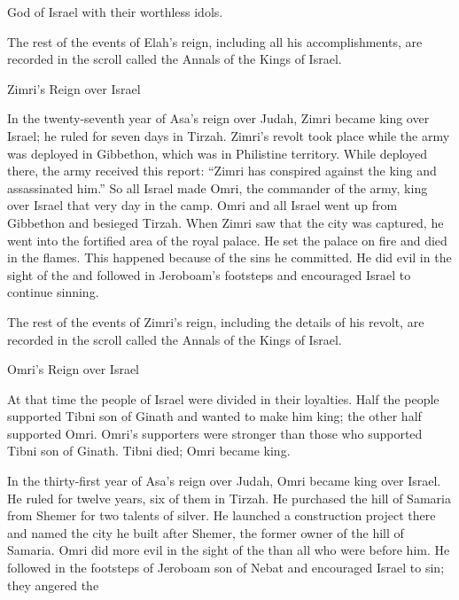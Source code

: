 {{}
God
of Israel
with their worthless idols.
\par }{\PP {}The rest
of the events
of Elah’s
reign, including all
his accomplishments,
are recorded
in the scroll
called the Annals
of the Kings
of Israel.
\par }{\SH Zimri’s Reign over Israel
\par }{\PP {}In the twenty-seventh
year
of Asa’s
reign over
Judah,
Zimri
became king over Israel; he ruled
for seven
days
in Tirzah.
Zimri’s revolt took place while the army
was deployed
in
Gibbethon,
which
was in Philistine territory.
While deployed
there, the army
received
this report: “Zimri
has conspired
against the king
and assassinated
him.” So all
Israel
made Omri,
the commander
of the army,
king over
Israel
that
very day
in the camp.
Omri
and all
Israel
went up
from Gibbethon
and besieged
Tirzah.
When
Zimri
saw
that
the city
was captured,
he went
into the fortified area
of the royal
palace.
He set
the palace
on
fire
and died in the flames.
This happened
because of the sins
he committed.
He did
evil
in the sight
of the
{}
and followed
in Jeroboam’s
footsteps
and encouraged
Israel
to continue sinning.
\par }{\PP {}The rest
of the events
of Zimri’s
reign, including
the details of his revolt,
are recorded
in
the scroll
called the Annals
of the Kings
of Israel.
\par }{\SH Omri’s Reign over Israel
\par }{\PP {}At that time
the people
of Israel
were divided
in their loyalties. Half
the people
supported
Tibni
son
of Ginath
and wanted to make
him king;
the other half
supported
Omri.
Omri’s
supporters
were stronger
than those
who supported
Tibni
son
of Ginath.
Tibni
died;
Omri
became king.
\par }{\PP {}In the thirty-first
year
of Asa’s
reign over
Judah,
Omri
became king
over
Israel.
He ruled
for twelve
years,
six
of them in Tirzah.
He purchased
the hill
of Samaria
from Shemer
for two talents
of silver.
He launched a construction project
there
and named
the city
he built
after
Shemer,
the former owner
of the hill
of Samaria.
Omri
did more evil
in the sight
of the
{}
than all
who
were before him.
He followed
in the footsteps
of Jeroboam
son
of Nebat
and encouraged
Israel
to sin;
they angered
the

}
